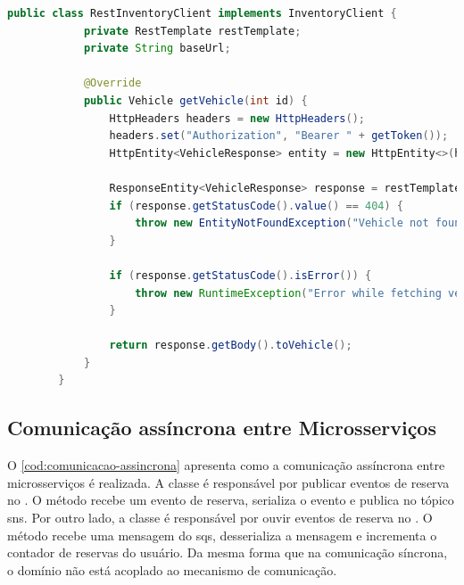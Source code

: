 \begin{codigo}[H]
    \begin{lstlisting}[language=Java]
        public class RestInventoryClient implements InventoryClient {
            private RestTemplate restTemplate;
            private String baseUrl;

            @Override
            public Vehicle getVehicle(int id) {
                HttpHeaders headers = new HttpHeaders();
                headers.set("Authorization", "Bearer " + getToken());
                HttpEntity<VehicleResponse> entity = new HttpEntity<>(headers);

                ResponseEntity<VehicleResponse> response = restTemplate.exchange(baseUrl + "/vehicles/{id}", HttpMethod.GET, entity, VehicleResponse.class, id);
                if (response.getStatusCode().value() == 404) {
                    throw new EntityNotFoundException("Vehicle not found");
                }

                if (response.getStatusCode().isError()) {
                    throw new RuntimeException("Error while fetching vehicle");
                }

                return response.getBody().toVehicle();
            }
        }
    \end{lstlisting}
    \caption{Método para obter um veículo do }
    \label{cod:rest-inventory-client}
\end{codigo}

\subsection{Comunicação assíncrona entre Microsserviços}
O \autoref{cod:comunicacao-assincrona} apresenta como a comunicação assíncrona entre microsserviços é realizada. A classe  é responsável por publicar eventos de reserva no . O método  recebe um evento de reserva, serializa o evento e publica no tópico \acrshort{sns}. Por outro lado, a classe  é responsável por ouvir eventos de reserva no . O método  recebe uma mensagem do \acrshort{sqs}, desserializa a mensagem e incrementa o contador de reservas do usuário. Da mesma forma que na comunicação síncrona, o domínio não está acoplado ao mecanismo de comunicação.


